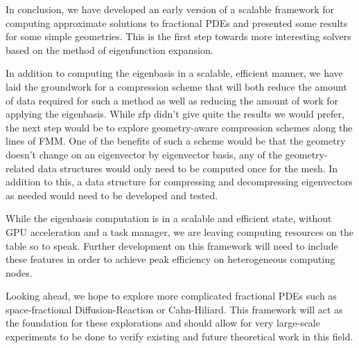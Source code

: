 In conclusion, we have developed an early version of a scalable framework for computing approximate solutions to fractional PDEs and presented some results for some simple geometries. This is the first step towards more interesting solvers based on the method of eigenfunction expansion. 

In addition to computing the eigenbasis in a scalable, efficient manner, we have laid the groundwork for a compression scheme that will both reduce the amount of data required for such a method as well as reducing the amount of work for applying the eigenbasis. While zfp didn't give quite the results we would prefer, the next step would be to explore geometry-aware compression schemes along the lines of FMM. One of the benefits of such a scheme would be that the geometry doesn't change on an eigenvector by eigenvector basis, any of the geometry-related data structures would only need to be computed once for the mesh. In addition to this, a data structure for compressing and decompressing eigenvectors as needed would need to be developed and tested.

While the eigenbasis computation is in a scalable and efficient state, without GPU acceleration and a task manager, we are leaving computing resources on the table so to speak. Further development on this framework will need to include these features in order to achieve peak efficiency on heterogeneous computing nodes.

Looking ahead, we hope to explore more complicated fractional PDEs such as space-fractional Diffusion-Reaction or Cahn-Hiliard. This framework will act as the foundation for these explorations and should allow for very large-scale experiments to be done to verify existing and future theoretical work in this field.